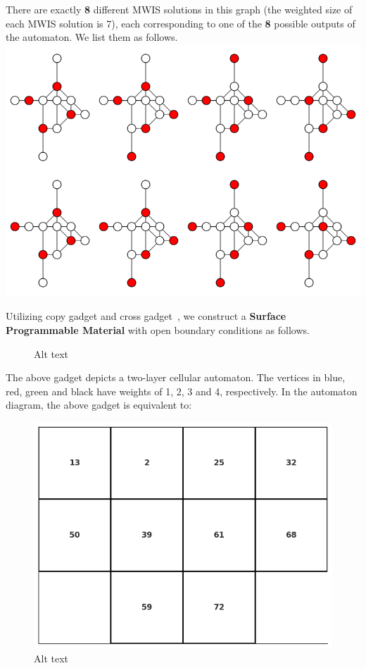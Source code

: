 \documentclass[twocolumn,superscriptaddress,english,showpacs,longbibliography]{revtex4-2}
\begin{document}
There are exactly \textbf{8} different MWIS solutions in this graph (the
weighted size of each MWIS solution is 7), each corresponding to one of
the \textbf{8} possible outputs of the automaton. We list them as
follows.
\includegraphics[width=\columnwidth]{../notes/images/gadget110.png}

Utilizing copy gadget and cross gadget~\cite{Nguyen2023}, we construct a \textbf{Surface Programmable Material} with open boundary conditions as follows.

\begin{figure}
\centering

\caption{Alt text}
\end{figure}

The above gadget depicts a two-layer cellular automaton. The vertices in
blue, red, green and black have weights of 1, 2, 3 and 4, respectively.
In the automaton diagram, the above gadget is equivalent to:

\begin{figure}
\centering
\includegraphics[width=\columnwidth]{../notes/images/rule110_2-2_automaton.png}
\caption{Alt text}
\end{figure}
\end{document}
